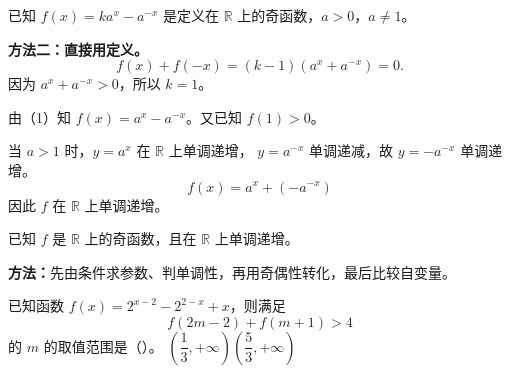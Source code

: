 \begin{frame}[label=C20a]
  已知 $f(x)=ka^x-a^{-x}$ 是定义在 $\mathbb R$ 上的奇函数，$a>0$，$a\ne1$。
  \pause
  \pause
  \par\vspace{0.2cm}
  \textbf{方法二：直接用定义。}
  \[
    f(x)+f(-x)=(k-1)(a^x+a^{-x})=0.
  \]
  因为 $a^x+a^{-x}>0$，所以 $k=1$。
\end{frame}

\begin{frame}[label=C20b]
  由（1）知 $f(x)=a^x-a^{-x}$。又已知 $f(1)>0$。
  \pause
  \pause
  \par\vspace{0.2cm}
  当 $a>1$ 时，$y=a^x$ 在 $\mathbb R$ 上单调递增，
  $y=a^{-x}$ 单调递减，故 $y=-a^{-x}$ 单调递增。
  \[
    f(x)=a^x+(-a^{-x})
  \]
  因此 $f$ 在 $\mathbb R$ 上单调递增。
\end{frame}

\begin{frame}[label=C20c]
  已知 $f$ 是 $\mathbb R$ 上的奇函数，且在 $\mathbb R$ 上单调递增。
  \pause
  \par
  \textbf{方法：}先由条件求参数、判单调性，再用奇偶性转化，最后比较自变量。
\end{frame}

\begin{frame}[label=C12q]
  已知函数 $f(x)=2^{x-2}-2^{2-x}+x$，则满足
  \[
    f(2m-2)+f(m+1)>4
  \]
  的 $m$ 的取值范围是（\quad）。
          {$\left(\dfrac13,+\infty\right)$}{$\left(\dfrac53,+\infty\right)$}
  \pause
\end{frame}

